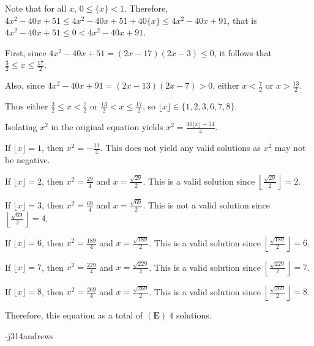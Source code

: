 \begin{enumerate}
 Note that for all $x$, $0 \leq \{x\} < 1$.  Therefore, $4x^2 - 40x + 51 \leq 4x^2 - 40x + 51 + 40\{x\} \leq 4x^2 - 40x + 91$, that is $4x^2 - 40x + 51 \leq 0 < 4x^2 - 40x + 91$.  

 First, since $4x^2 - 40x + 51 = (2x - 17)(2x - 3) \leq 0$, it follows that $\frac{3}{2} \leq x \leq \frac{17}{2}$.  

 Also, since $4x^2 - 40x + 91 = (2x - 13)(2x - 7) > 0$, either $x < \frac{7}{2}$ or $x > \frac{13}{2}$.

 Thus either $\frac{3}{2} \leq x < \frac{7}{2}$ or $\frac{13}{2} < x \leq \frac{17}{2}$, so $\lfloor x \rfloor \in \{1, 2, 3, 6, 7, 8\}$.

 Isolating $x^2$ in the original equation yields $x^2 = \frac{40\lfloor x \rfloor - 51}{4}$.  

 If $\lfloor x \rfloor = 1$, then $x^2 = -\frac{11}{4}$.  This does not yield any valid solutions as $x^2$ may not be negative.

 If $\lfloor x \rfloor = 2$, then $x^2 = \frac{29}{4}$ and $x = \frac{\sqrt{29}}{2}$.  This is a valid solution since $\left\lfloor\frac{\sqrt{29}}{2}\right\rfloor = 2$.

 If $\lfloor x \rfloor = 3$, then $x^2 = \frac{69}{4}$ and $x = \frac{\sqrt{69}}{2}$.  This is not a valid solution since $\left\lfloor\frac{\sqrt{69}}{2}\right\rfloor = 4$.

 If $\lfloor x \rfloor = 6$, then $x^2 = \frac{189}{4}$ and $x = \frac{\sqrt{189}}{2}$.  This is a valid solution since $\left\lfloor\frac{\sqrt{189}}{2}\right\rfloor = 6$.

 If $\lfloor x \rfloor = 7$, then $x^2 = \frac{229}{4}$ and $x = \frac{\sqrt{229}}{2}$.  This is a valid solution since $\left\lfloor\frac{\sqrt{229}}{2}\right\rfloor = 7$.

 If $\lfloor x \rfloor = 8$, then $x^2 = \frac{269}{4}$ and $x = \frac{\sqrt{269}}{2}$.  This is a valid solution since $\left\lfloor\frac{\sqrt{269}}{2}\right\rfloor = 8$.

 Therefore, this equation as a total of $\boxed{(\textbf{E})\ 4}$ solutions.

 -j314andrews

 


\end{enumerate}